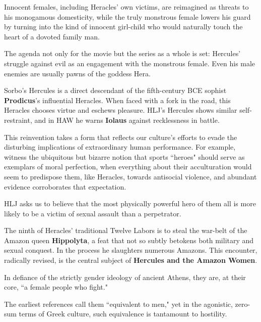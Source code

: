 \begin{rmk}
    Innocent females, including Heracles' own victims, are reimagined as threats to his monogamous domesticity, while the truly monstrous female lowers his guard by turning into the kind of innocent girl-child who would naturally touch the heart of a dovoted family man.
\end{rmk}

The agenda not only for the movie but the series as a whole is set: Hercules' struggle against evil as an engagement with the monstrous female. Even his male enemies are usually pawns of the goddess Hera. 

\begin{nte}
    Sorbo's Hercules is a direct descendant of the fifth-century BCE sophist \textbf{Prodicus}'s influential Heracles. When faced with a fork in the road, this Heracles chooses virtue and eschews pleasure. HLJ's Hercules shows similar self-restraint, and in HAW he warns \textbf{Iolaus} against recklessness in battle.
\end{nte}

This reinvention takes a form that reflects our culture's efforts to evade the disturbing implications of extraordinary human performance. For example, witness the ubiquitous but bizarre notion that sports ``heroes" should serve as exemplars of moral perfection, when everything about their acculturation would seem to predispose them, like Heracles, towards antisocial violence, and abundant evidence corroborates that expectation.

\begin{rmk}
    HLJ asks us to believe that the most physically powerful hero of them all is more likely to be a victim of sexual assault than a perpetrator.
\end{rmk}


The ninth of Heracles' traditional Twelve Labors is to steal the war-belt of the Amazon queen \textbf{Hippolyta}, a feat that not so subtly betokens both military and sexual conquest. In the process he slaughters numerous Amazons. This encounter, radically revised, is the central subject of \textbf{Hercules and the Amazon Women}.

\begin{nte}
    In defiance of the strictly gender ideology of ancient Athens, they are, at their core, ``a female people who fight."
\end{nte}

The earliest references call them ``equivalent to men," yet in the agonistic, zero-sum terms of Greek culture, such equivalence is tantamount to hostility.

